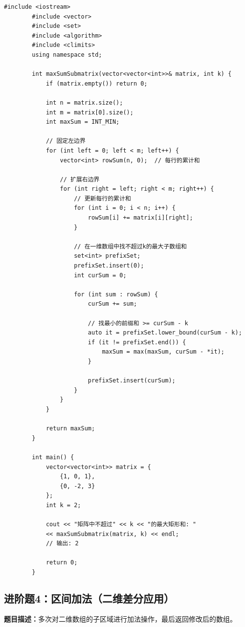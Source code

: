 \documentclass[12pt,a4paper]{article}
\begin{document}
	\begin{lstlisting}[caption={进阶题3：矩形区域不超过K的最大数值和}]
		#include <iostream>
		#include <vector>
		#include <set>
		#include <algorithm>
		#include <climits>
		using namespace std;
		
		int maxSumSubmatrix(vector<vector<int>>& matrix, int k) {
			if (matrix.empty()) return 0;
			
			int n = matrix.size();
			int m = matrix[0].size();
			int maxSum = INT_MIN;
			
			// 固定左边界
			for (int left = 0; left < m; left++) {
				vector<int> rowSum(n, 0);  // 每行的累计和
				
				// 扩展右边界
				for (int right = left; right < m; right++) {
					// 更新每行的累计和
					for (int i = 0; i < n; i++) {
						rowSum[i] += matrix[i][right];
					}
					
					// 在一维数组中找不超过k的最大子数组和
					set<int> prefixSet;
					prefixSet.insert(0);
					int curSum = 0;
					
					for (int sum : rowSum) {
						curSum += sum;
						
						// 找最小的前缀和 >= curSum - k
						auto it = prefixSet.lower_bound(curSum - k);
						if (it != prefixSet.end()) {
							maxSum = max(maxSum, curSum - *it);
						}
						
						prefixSet.insert(curSum);
					}
				}
			}
			
			return maxSum;
		}
		
		int main() {
			vector<vector<int>> matrix = {
				{1, 0, 1},
				{0, -2, 3}
			};
			int k = 2;
			
			cout << "矩阵中不超过" << k << "的最大矩形和: " 
			<< maxSumSubmatrix(matrix, k) << endl;
			// 输出: 2
			
			return 0;
		}
	\end{lstlisting}
	
	\subsection{进阶题4：区间加法（二维差分应用）}
	
	\textbf{题目描述：}多次对二维数组的子区域进行加法操作，最后返回修改后的数组。
	
\end{document}
